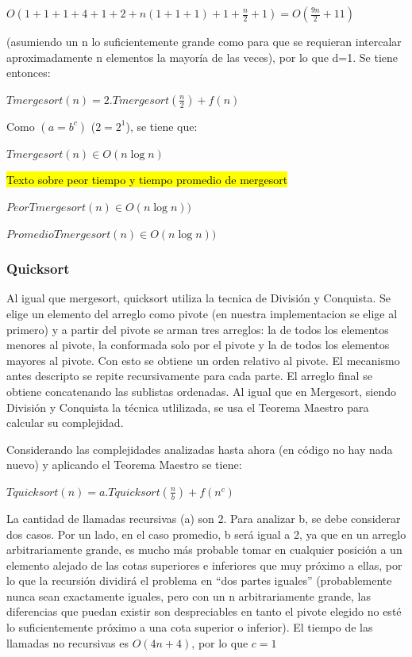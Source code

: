 \documentclass[article,a4paper]{article}
\begin{document}
$O(1 + 1 + 1 +4 + 1+ 2 +n(1 + 1 +1) + 1 + \frac{n}{2} +1 ) = O( \frac{9n}{2} +11 )$

(asumiendo un n lo suficientemente grande como para que se requieran intercalar aproximadamente n elementos la mayoría de las veces), por lo que d=1. Se tiene entonces:

$Tmergesort(n) = 2.Tmergesort(\frac{n}{2}) + f(n)$

Como $(a = b^c)$ ($2 = 2^1$), se tiene que:

$Tmergesort(n) \in O(n \log n)$

\hl{Texto sobre peor tiempo y tiempo promedio de mergesort}

$PeorTmergesort(n) \in O(n \log n))$

$PromedioTmergesort(n) \in O(n \log n))$

\subsubsection{Quicksort}

Al igual que mergesort, quicksort utiliza la tecnica de División y Conquista. Se elige un elemento del arreglo como pivote (en nuestra implementacion se elige al primero) y a partir del pivote se arman tres arreglos: la de todos los elementos menores al pivote, la conformada solo por el pivote y la de todos los elementos mayores al pivote. Con esto se obtiene un orden relativo al pivote. El mecanismo antes descripto se repite recursivamente para cada parte. El arreglo final se obtiene concatenando las sublistas ordenadas. Al igual que en Mergesort, siendo División y Conquista la técnica utlilizada, se usa el Teorema Maestro para calcular su complejidad.

Considerando las complejidades analizadas hasta ahora (en código no hay nada nuevo) y aplicando el Teorema Maestro se tiene:

$Tquicksort(n) = a.Tquicksort(\frac{n}{b}) + f(n^c)$

La cantidad de llamadas recursivas (a) son 2. Para analizar b, se debe considerar dos casos. Por un lado, en el caso promedio, b será igual a 2, ya que en un arreglo arbitrariamente grande, es mucho más probable tomar en cualquier posición a un elemento alejado de las cotas superiores e inferiores que muy próximo a ellas, por lo que la recursión dividirá el problema en “dos partes iguales” (probablemente nunca sean exactamente iguales, pero con un n arbitrariamente grande, las diferencias que puedan existir son despreciables en tanto el pivote elegido no esté lo suficientemente próximo a una cota superior o inferior). El tiempo de las llamadas no recursivas es $O(4n + 4)$, por lo que $c=1$
\end{document}
